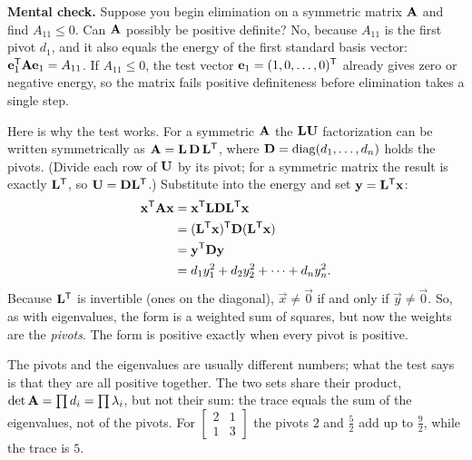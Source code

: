 \begin{recoverybox}
\textbf{Mental check.} Suppose you begin elimination on a symmetric matrix $\mathbf{A}$ and find
$A_{11} \leq 0$. Can $\mathbf{A}$ possibly be positive definite? No, because $A_{11}$ is the first
pivot $d_1$, and it also equals the energy of the first standard basis vector:
$\mathbf{e}_1^{\mathsf{T}}\mathbf{A}\mathbf{e}_1 = A_{11}$. If $A_{11} \leq 0$, the test vector $\mathbf{e}_1 = (1, 0, \dots, 0)^{\mathsf{T}}$
already gives zero or negative energy, so the matrix fails positive definiteness before elimination takes
a single step.
\end{recoverybox}

Here is why the test works. For a symmetric $\mathbf{A}$ the $\mathbf{L}\mathbf{U}$ factorization can be
written symmetrically as $\mathbf{A} = \mathbf{L}\,\mathbf{D}\,\mathbf{L}^{\mathsf{T}}$, where $\mathbf{D} =
\operatorname{diag}(d_1,\dots,d_n)$ holds the pivots. (Divide each row of $\mathbf{U}$ by its pivot; for a symmetric
matrix the result is exactly $\mathbf{L}^{\mathsf{T}}$, so $\mathbf{U} = \mathbf{D}\mathbf{L}^{\mathsf{T}}$.) Substitute into the
energy and set $\mathbf{y} = \mathbf{L}^{\mathsf{T}}\mathbf{x}$:
\begin{align*}
  \mathbf{x}^{\mathsf{T}}\mathbf{A}\mathbf{x}
  &= \mathbf{x}^{\mathsf{T}}\mathbf{L}\mathbf{D}\mathbf{L}^{\mathsf{T}}\mathbf{x} \\
  &= (\mathbf{L}^{\mathsf{T}}\mathbf{x})^{\mathsf{T}} \mathbf{D} (\mathbf{L}^{\mathsf{T}}\mathbf{x}) \\
  &= \mathbf{y}^{\mathsf{T}}\mathbf{D}\mathbf{y} \\
  &= d_1 y_1^2 + d_2 y_2^2 + \cdots + d_n y_n^2.
\end{align*}
Because $\mathbf{L}^{\mathsf{T}}$ is invertible (ones on the diagonal), $\vec{x}\neq\vec{0}$ if and only if
$\vec{y}\neq\vec{0}$. So, as with eigenvalues, the form is a weighted sum of squares, but now the
weights are the \emph{pivots}. The form is positive exactly when every pivot is positive.

The pivots and the eigenvalues are usually different numbers; what the test says is that they are
all positive together. The two sets share their product, $\det\mathbf{A} = \prod d_i = \prod
\lambda_i$, but not their sum: the trace equals the sum of the eigenvalues, not of the pivots. For
$\begin{bmatrix}2&1\\1&3\end{bmatrix}$ the pivots $2$ and $\tfrac52$ add up to $\tfrac92$, while
the trace is $5$.

